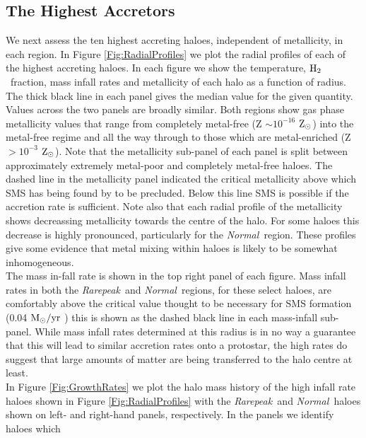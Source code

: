 \documentclass[graphics, twocolumn, usenatbib]{mn2e}
\newcommand{\msolaryr} {$\rm{M_{\odot}/yr}~$}
\newcommand{\zsolarc} {$\rm{Z_{\odot}}$}
\newcommand{\molH} {$\rm{H_2}$~}
\newcommand{\rarepeak} {\textit{Rarepeak~}}
\newcommand{\normal} {\textit{Normal~}}
\begin{document}
\subsection{The Highest Accretors}
\indent We next assess the ten highest accreting haloes, independent of metallicity, in each region.
In Figure \ref{Fig:RadialProfiles} we plot the radial profiles of each of the highest
accreting haloes.
In each figure we show the temperature, \molH fraction, mass infall rates and
metallicity of each halo as a function of radius. The thick black line in each panel gives the
median value for the given quantity. Values across the two panels are broadly similar. Both regions
show gas phase metallicity values that range from completely metal-free (Z $\sim 10^{-16}$ \zsolarc)
into the metal-free regime and all the way through to those which are metal-enriched (Z $> 10^{-3}$
\zsolarc). Note that the metallicity sub-panel of each panel
is split between approximately extremely metal-poor and completely metal-free haloes. The dashed
line in the metallicity panel indicated the critical metallicity above which
SMS has being found by \cite{Chon_2020} to be precluded. Below this line SMS is possible if the
accretion rate is sufficient. Note also that each radial profile of the metallicity shows decreassing
metallicity towards the centre of the halo. For some haloes this decrease is highly pronounced,
particularly for the \normal region. These profiles give some evidence that metal mixing within
haloes is likely to be somewhat inhomogeneous. \\
\indent The mass in-fall rate is shown in the top right panel of each figure. 
Mass infall rates in both the \rarepeak and \normal regions, for these select haloes, are
comfortably above the critical value thought to be necessary for SMS formation (0.04
\msolaryr \citep{Sakurai_2016}) this is shown as the dashed black line in each mass-infall sub-panel.
While mass infall rates determined at this radius is in no
way a guarantee that this will lead to similar accretion rates onto a protostar, the high rates do
suggest that large amounts of matter are being transferred to the halo centre at least. \\
\indent In Figure \ref{Fig:GrowthRates} we plot the halo mass history of the high infall
rate haloes shown in Figure \ref{Fig:RadialProfiles} with the \rarepeak and \normal haloes
shown on left- and right-hand panels, respectively. In the panels we identify haloes which
\end{document}
